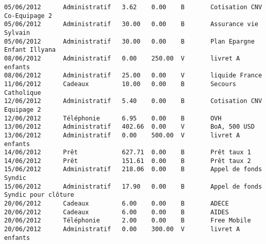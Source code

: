 \begin{verbatim}
05/06/2012      Administratif   3.62    0.00    B       Cotisation CNV Co-Equipage 2
05/06/2012      Administratif   30.00   0.00    B       Assurance vie Sylvain
05/06/2012      Administratif   30.00   0.00    B       Plan Epargne Enfant Illyana
08/06/2012      Administratif   0.00    250.00  V       livret A enfants
08/06/2012      Administratif   25.00   0.00    V       liquide France
11/06/2012      Cadeaux         10.00   0.00    B       Secours Catholique
12/06/2012      Administratif   5.40    0.00    B       Cotisation CNV Equipage 2
12/06/2012      Téléphonie      6.95    0.00    B       OVH
13/06/2012      Administratif   402.66  0.00    V       BoA, 500 USD
13/06/2012      Administratif   0.00    500.00  V       livret A enfants
14/06/2012      Prêt            627.71  0.00    B       Prêt taux 1
14/06/2012      Prêt            151.61  0.00    B       Prêt taux 2
15/06/2012      Administratif   218.06  0.00    B       Appel de fonds Syndic
15/06/2012      Administratif   17.90   0.00    B       Appel de fonds Syndic pour clôture
20/06/2012      Cadeaux         6.00    0.00    B       ADECE
20/06/2012      Cadeaux         6.00    0.00    B       AIDES
20/06/2012      Téléphonie      2.00    0.00    B       Free Mobile
20/06/2012      Administratif   0.00    300.00  V       livret A enfants
\end{verbatim}
\normalsize
